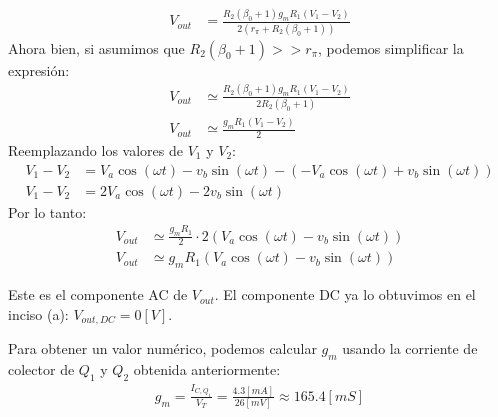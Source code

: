 \documentclass[
  11pt,
  letterpaper,
   addpoints,
   answers
  ]{exam}
\begin{document}
\begin{questions}
\begin{parts}
\begin{solution}
\begin{align}
  V_{out} &= \frac{R_{2}(\beta_{0} + 1) g_{m} R_{1} (V_{1} - V_{2})}{2(r_{\pi} + R_{2}(\beta_{0} + 1))}
\end{align}
Ahora bien, si asumimos que $R_{2}(\beta_{0} + 1) >> r_{\pi}$, podemos simplificar la expresión:
\begin{align}
  V_{out} &\simeq \frac{R_{2}(\beta_{0} + 1) g_{m} R_{1} (V_{1} - V_{2})}{2 R_{2}(\beta_{0} + 1)}\\
  V_{out} &\simeq \frac{g_{m} R_{1} (V_{1} - V_{2})}{2}
\end{align}
Reemplazando los valores de $V_1$ y $V_2$:
\begin{align}
  V_{1} - V_{2} &= V_a \cos(\omega t) - v_b \sin(\omega t) - (-V_a \cos(\omega t) + v_b \sin(\omega t))\\
  V_{1} - V_{2} &= 2V_a \cos(\omega t) - 2v_b \sin(\omega t)
\end{align}
Por lo tanto:
\begin{align}
  V_{out} &\simeq \frac{g_{m} R_{1}}{2} \cdot 2(V_a \cos(\omega t) - v_b \sin(\omega t))\\
  V_{out} &\simeq g_{m} R_{1} (V_a \cos(\omega t) - v_b \sin(\omega t))
\end{align}

Este es el componente AC de $V_{out}$. El componente DC ya lo obtuvimos en el inciso (a): $V_{out,DC} = 0[V]$.

Para obtener un valor numérico, podemos calcular $g_m$ usando la corriente de colector de $Q_1$ y $Q_2$ obtenida anteriormente:
\begin{align}
  g_m = \frac{I_{C,Q_1}}{V_T} = \frac{4.3[mA]}{26[mV]} \approx 165.4[mS]
\end{align}


\end{solution}
\end{parts}
\end{questions}
\end{document}
